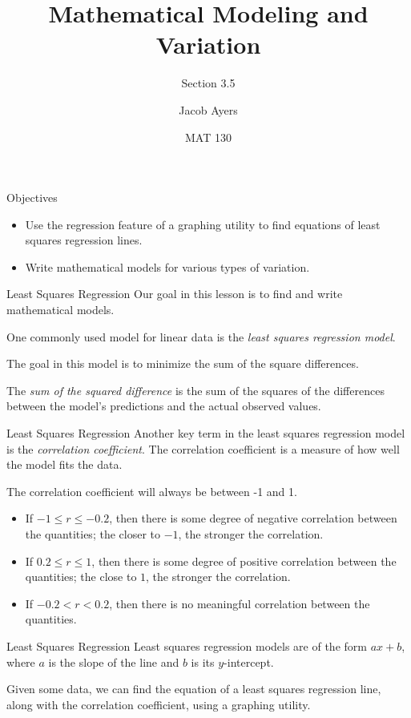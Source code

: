 \documentclass[t]{beamer}
\title[3.5]{Mathematical Modeling and Variation}
\subtitle{Section 3.5}
\author{Jacob Ayers}
\institute{Lesson \#14}
\date{MAT 130}
\begin{document}
	
	\begin{frame}
		\titlepage
	\end{frame}
	
	\begin{frame}{Objectives}
		\begin{itemize}
			\item Use the regression feature of a graphing utility to find equations of least squares regression lines.
			\item Write mathematical models for various types of variation.
		\end{itemize}
	\end{frame}

	\begin{frame}{Least Squares Regression}
		Our goal in this lesson is to find and write mathematical models.
		
		One commonly used model for linear data is the \textit{least squares regression model}. \pause
		
		The goal in this model is to minimize the sum of the square differences.
		
		The \textit{sum of the squared difference} is the sum of the squares of the differences between the model's predictions and the actual observed values.
	\end{frame}

	\begin{frame}{Least Squares Regression}
		Another key term in the least squares regression model is the \textit{correlation coefficient}. The correlation coefficient is a measure of how well the model fits the data. \pause
		
		The correlation coefficient will always be between -1 and 1. \begin{itemize}
			\item If $-1 \leq r \leq -0.2$, then there is some degree of negative correlation between the quantities; the closer to $-1$, the stronger the correlation.
			\item If $0.2 \leq r \leq 1$, then there is some degree of positive correlation between the quantities; the close to $1$, the stronger the correlation.
			\item If $-0.2 < r < 0.2$, then there is no meaningful correlation between the quantities.
		\end{itemize}
	\end{frame}

	\begin{frame}{Least Squares Regression}
		Least squares regression models are of the form $ax + b$, where $a$ is the slope of the line and $b$ is its $y$-intercept. \pause
		
		Given some data, we can find the equation of a least squares regression line, along with the correlation coefficient, using a graphing utility.
	\end{frame}
\end{document}

